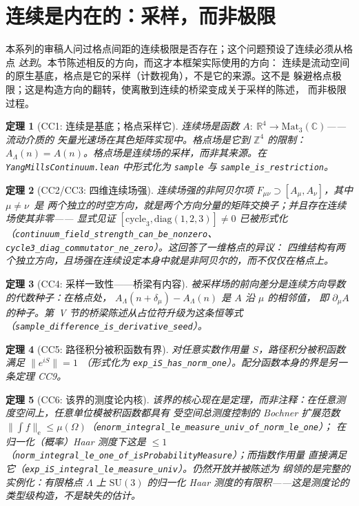 \documentclass[aps,prd,preprint,superscriptaddress,amsmath,amssymb]{revtex4-2}
\newtheorem{theorem}{定理}[section]
\begin{document}
\section{连续是内在的：采样，而非极限}
\label{sec:intrinsic}

本系列的审稿人问过格点间距的连续极限是否存在；这个问题预设了连续必须从格点
\emph{达到}。本节陈述相反的方向，而这才本框架实际使用的方向：
连续是流动空间的原生基底，格点是它的采样（计数视角），不是它的来源。这不是
躲避格点极限；这是构造方向的翻转，使离散到连续的桥梁变成关于采样的陈述，
而非极限过程。

\begin{theorem}[CC1: 连续是基底；格点采样它]
\label{thm:cc1}
连续场是函数 $A:\ \mathbb{R}^4\to \mathrm{Mat}_3(\mathbb{C})$——流动介质的
矢量光速场在其色矩阵实现中。格点场是它到 $\mathbb{Z}^4$ 的限制：
$A_\Lambda(n)=A(n)$。格点场是连续场的采样，而非其来源。在
\texttt{YangMillsContinuum.lean} 中形式化为 \texttt{sample} 与
\texttt{sample\_is\_restriction}。
\end{theorem}

\begin{theorem}[CC2/CC3: 四维连续场强]
\label{thm:cc2}
连续场强的非阿贝尔项 $F_{\mu\nu}\supset [A_\mu,A_\nu]$，其中 $\mu\neq\nu$\ 是
两个独立的时空方向，就是两个方向分量的矩阵交换子；并且存在连续场使其非零——
显式见证 $[\mathrm{cycle}_3,\mathrm{diag}(1,2,3)]\neq0$ 已被形式化
（\texttt{continuum\_field\_\allowbreak strength\_can\_be\_nonzero}、
\texttt{cycle3\_diag\_\allowbreak commutator\_ne\_zero}）。这回答了一维格点的异议：
四维结构有两个独立方向，且场强在连续设定本身中就是非阿贝尔的，而不仅仅在格点上。
\end{theorem}

\begin{theorem}[CC4: 采样一致性——桥梁有内容]
\label{thm:cc4}
被采样场的前向差分是连续方向导数的代数种子：在格点处，
$A_\Lambda(n+\delta_\mu)-A_\Lambda(n)$ 是 $A$ 沿 $\mu$ 的相邻值，
即 $\partial_\mu A$ 的种子。第~V 节的桥梁陈述从占位符升级为这条恒等式
（\texttt{sample\_difference\_is\_derivative\_seed}）。
\end{theorem}

\begin{theorem}[CC5: 路径积分被积函数有界]
\label{thm:cc5}
对任意实数作用量 $S$，路径积分被积函数满足 $\|e^{iS}\|=1$
（形式化为 \texttt{exp\_iS\_has\_norm\_one}）。配分函数本身的界是另一条定理 CC9。
\end{theorem}

\begin{theorem}[CC6: 该界的测度论内核]
\label{thm:cc6}
该界的核心现在是定理，而非注释：在任意测度空间上，任意单位模被积函数都具有
受空间总测度控制的 Bochner 扩展范数 $\bigl\|\int f\bigr\|_\mathrm{e}\le
\mu(\Omega)$（\texttt{enorm\_integral\_le\_\allowbreak measure\_univ\_of\_norm\_le\_one}）；
在归一化（概率）Haar 测度下这是 $\le 1$
（\texttt{norm\_integral\_le\_\allowbreak one\_of\_isProbabilityMeasure}）；而指数作用量
直接满足它（\texttt{exp\_iS\_integral\_le\_\allowbreak measure\_univ}）。仍然开放并被陈述为
纲领的是完整的实例化：有限格点 $\Lambda$ 上 $\mathrm{SU}(3)$ 的归一化 Haar
测度的有限积——这是测度论的类型级构造，不是缺失的估计。
\end{theorem}
\end{document}
